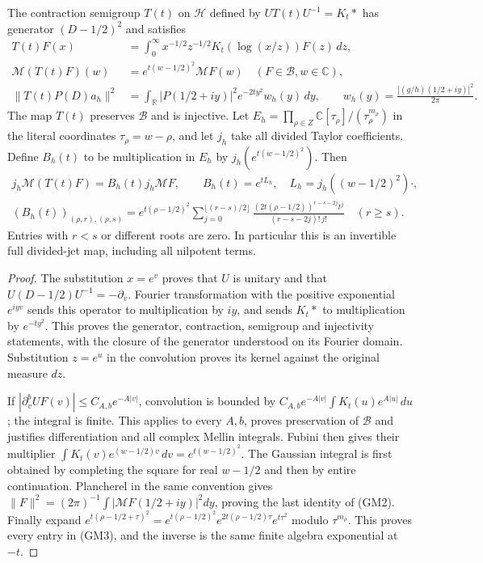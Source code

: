 \begin{hzoctheorem}
The contraction semigroup $T(t)$ on $\mathcal H$ defined by
$UT(t)U^{-1}=K_t*$ has generator $(D-1/2)^2$ and satisfies
\begin{equation}\tag{GM2}
 \begin{split}
 T(t)F(x)&=\int_0^\infty
       x^{-1/2}z^{-1/2}K_t(\log(x/z))F(z)\,dz,\\
 \mathcal M(T(t)F)(w)&=e^{t(w-1/2)^2}\mathcal M F(w)
       \quad(F\in\mathscr B, w\in\mathbb C),\\
 \|T(t)P(D)a_h\|^2&=\int_{\mathbb R}
       |P(1/2+iy)|^2 e^{-2ty^2} w_h(y)\,dy,\qquad
 w_h(y)=\frac{|(g/h)(1/2+iy)|^2}{2\pi}.
 \end{split}
\end{equation}
The map $T(t)$ preserves $\mathscr B$ and is injective.  Let
$E_h=\prod_{\rho\in Z}\mathbb C[\tau_\rho]/(\tau_\rho^{m_\rho})$
in the literal coordinates $\tau_\rho=w-\rho$, and let $j_h$ take
all divided Taylor coefficients.  Define $B_h(t)$ to be multiplication
in $E_h$ by $j_h(e^{t(w-1/2)^2})$.  Then
\begin{equation}\tag{GM3}
 \begin{gathered}
 j_h\mathcal M(T(t)F)=B_h(t)j_h\mathcal M F,\qquad
 B_h(t)=e^{tL_h},\quad L_h=j_h((w-1/2)^2)\cdot,\\
 (B_h(t))_{(\rho,r),(\rho,s)}
 =e^{t(\rho-1/2)^2}
 \sum_{j=0}^{\lfloor(r-s)/2\rfloor}
 \frac{(2t(\rho-1/2))^{r-s-2j}t^j}{(r-s-2j)!\,j!}
 \quad(r\geq s).
 \end{gathered}
\end{equation}
Entries with $r<s$ or different roots are zero.  In particular this is
an invertible full divided-jet map, including all nilpotent terms.
\end{hzoctheorem}
\begin{proof}
The substitution $x=e^v$ proves that $U$ is unitary and that
$U(D-1/2)U^{-1}=-\partial_v$.  Fourier transformation with the
positive exponential $e^{iyv}$ sends this operator to multiplication
by $iy$, and sends $K_t*$ to multiplication by $e^{-ty^2}$.
This proves the generator, contraction, semigroup and injectivity
statements, with the closure of the generator understood on its
Fourier domain.  Substitution $z=e^u$ in the convolution proves its
kernel against the original measure $dz$.

If $|\partial_v^b UF(v)|\leq C_{A,b}e^{-A|v|}$, convolution is bounded
by $C_{A,b}e^{-A|v|}\int K_t(u)e^{A|u|}\,du$; the integral is finite.
This applies to every $A,b$, proves preservation of $\mathscr B$ and
justifies differentiation and all complex Mellin integrals.  Fubini
then gives their multiplier $\int K_t(v)e^{(w-1/2)v}\,dv
=e^{t(w-1/2)^2}$.  The Gaussian integral is first obtained by
completing the square for real $w-1/2$ and then by entire continuation.
Plancherel in the same convention gives
$\|F\|^2=(2\pi)^{-1}\int|\mathcal M F(1/2+iy)|^2dy$, proving the
last identity of (GM2).  Finally expand
$e^{t(\rho-1/2+\tau)^2}
=e^{t(\rho-1/2)^2}e^{2t(\rho-1/2)\tau}e^{t\tau^2}$
modulo $\tau^{m_\rho}$.  This proves every entry in (GM3), and the
inverse is the same finite algebra exponential at $-t$.
\end{proof}

